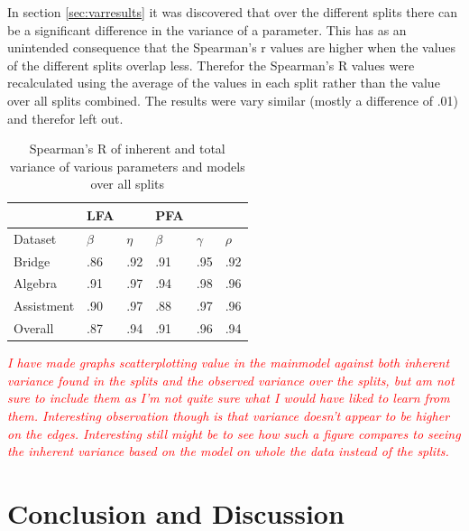 \documentclass{scrartcl}
\newcommand\todo[1]{\textit{\textcolor{red}{#1}}}
\begin{document}
In section \ref{sec:varresults} it was discovered that over the different splits there can be a significant difference in the variance of a parameter. This has as an unintended consequence that the Spearman's r values are higher when the values of the different splits overlap less. Therefor the Spearman's R values were recalculated using the average of the values in each split rather than the value over all splits combined. The results were vary similar (mostly a difference of .01) and therefor left out. 
\begin{center}
\begin{table}[!htbp]
\begin{tabular}{| l || l | l ||l|l |l|}

    \hline
     & LFA  & & PFA & &   \\ \hline
    Dataset & $\beta$ & $\eta$ & $\beta$ & $\gamma$ & $\rho$  \\ \hline
    Bridge     & .86 & .92 & .91 & .95 & .92 \\ \hline
    Algebra    & .91 & .97 & .94 & .98 & .96 \\ \hline
    Assistment & .90 & .97 & .88 & .97 & .96 \\ \hline \hline
    Overall    & .87 & .94 & .91 & .96 & .94 \\
    \hline
\end{tabular}
\caption{Spearman's R of inherent and total variance of various parameters and models over all splits}
\label{tab:intorank}
\end{table}
\end{center}

\todo{
I have made graphs scatterplotting value in the mainmodel against both inherent variance found in the splits and the observed variance over the splits, but am not sure to include them as I'm not quite sure what I would have liked to learn from them. Interesting observation though is that variance doesn't appear to be higher on the edges.
Interesting still might be to see how such a figure compares to seeing the inherent variance based on the model on whole the data instead of the splits.}

\newpage
\section{Conclusion and Discussion}
\end{document}
